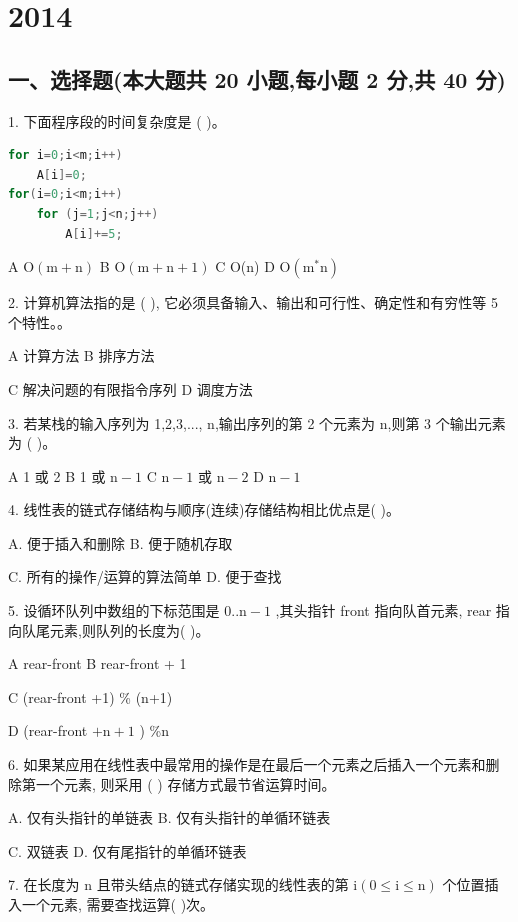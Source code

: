 \chapter{2014}
\section*{一、选择题(本大题共 20 小题,每小题 2 分,共 40 分)}

1. 下面程序段的时间复杂度是 (  )。
\begin{lstlisting}[language=C, basicstyle=\ttfamily]
for i=0;i<m;i++)
    A[i]=0;
for(i=0;i<m;i++)
    for (j=1;j<n;j++)
        A[i]+=5;
\end{lstlisting}

A \(\mathrm{O}\left( {\mathrm{m} + \mathrm{n}}\right)\) B \(\mathrm{O}\left( {\mathrm{m} + \mathrm{n} + 1}\right)\) C O(n) D \(\mathrm{O}\left( {{\mathrm{m}}^{ * }\mathrm{n}}\right)\)

2. 计算机算法指的是 (  ), 它必须具备输入、输出和可行性、确定性和有穷性等 5 个特性。。

A 计算方法 B 排序方法

C 解决问题的有限指令序列 D 调度方法

3. 若某栈的输入序列为 1,2,3,..., n,输出序列的第 2 个元素为 n,则第 3 个输出元素为 (  )。

A 1 或 2 B 1 或 \(\mathrm{n} - 1\) C \(\mathrm{n} - 1\) 或 \(\mathrm{n} - 2\) D \(\mathrm{n} - 1\)

4. 线性表的链式存储结构与顺序(连续)存储结构相比优点是(  )。

A. 便于插入和删除 B. 便于随机存取

C. 所有的操作/运算的算法简单 D. 便于查找

5. 设循环队列中数组的下标范围是 \(0..\mathrm{n} - 1\) ,其头指针 front 指向队首元素, rear 指向队尾元素,则队列的长度为(  )。

A rear-front B rear-front + 1

C (rear-front +1) \% (n+1)

D (rear-front \(+ \mathrm{n} + 1\) ) \%n

6. 如果某应用在线性表中最常用的操作是在最后一个元素之后插入一个元素和删除第一个元素, 则采用 (  ) 存储方式最节省运算时间。

A. 仅有头指针的单链表 B. 仅有头指针的单循环链表

C. 双链表 D. 仅有尾指针的单循环链表

7. 在长度为 \(\mathrm{n}\) 且带头结点的链式存储实现的线性表的第 \(\mathrm{i}\left( {0 \leq  \mathrm{i} \leq  \mathrm{n}}\right)\) 个位置插入一个元素, 需要查找运算( )次。

